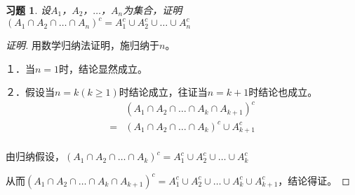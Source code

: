 \documentclass{article}
\begin{document}
\begin{CJK}{UTF8}{gbsn}
\newtheorem*{Ex}{习题}
  \begin{Ex}
    设$A_1$，$A_2$，$\ldots$，$A_n$为集合，证明$(A_1\cap A_2\cap \ldots \cap A_n)^c = A_1^c\cup A_2^c\cup \ldots \cup A_n^c$
\end{Ex}

\begin{proof}[证明]
  用数学归纳法证明，施归纳于$n$。
  
  １．当$n=1$时，结论显然成立。

  ２．假设当$n=k(k\geq 1)$时结论成立，往证当$n=k+1$时结论也成立。
  \begin{equation*}
    \begin{split}
      &(A_1\cap A_2\cap \ldots \cap A_k \cap A_{k+1})^c\\
      =&(A_1\cap A_2\cap \ldots \cap A_k)^c \cup A_{k+1}^c\\
    \end{split}
  \end{equation*}
  
  由归纳假设，$(A_1\cap A_2\cap \ldots \cap A_k)^c = A_1^c\cup A_2^c\cup \ldots \cup A_k^c$

  从而$(A_1\cap A_2\cap \ldots \cap A_k\cap A_{k+1})^c = A_1^c\cup A_2^c\cup \ldots \cup A_k^c\cup A_{k+1}^c$，结论得证。
  
\end{proof}
\end{CJK}
\end{document}
